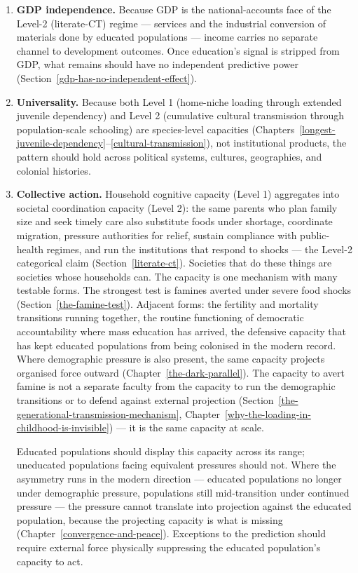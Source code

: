 \documentclass[12pt,letterpaper]{article}
\begin{document}
\begin{enumerate}
\item \textbf{GDP independence.} Because GDP is the
national-accounts face of the Level-2 (literate-CT) regime ---
services and the industrial conversion of materials done by educated
populations --- income carries no separate channel to development
outcomes. Once education's signal is stripped from GDP, what remains
should have no independent predictive power
(Section~\ref{gdp-has-no-independent-effect}).\label{pred:income}

\item \textbf{Universality.} Because both Level 1 (home-niche
loading through extended juvenile dependency) and Level 2
(cumulative cultural transmission through population-scale
schooling) are species-level capacities
(Chapters~\ref{longest-juvenile-dependency}--\ref{cultural-transmission}),
not institutional products, the pattern should hold across political
systems, cultures, geographies, and colonial
histories.\label{pred:universality}

\item \textbf{Collective action.} Household cognitive capacity
(Level 1) aggregates into societal coordination capacity (Level 2):
the same parents who plan family size and seek timely care also
substitute foods under shortage, coordinate migration, pressure
authorities for relief, sustain compliance with public-health
regimes, and run the institutions that respond to shocks --- the
Level-2 categorical claim (Section~\ref{literate-ct}). Societies
that do these things are societies whose households can. The capacity is one mechanism with many testable forms. The strongest
test is famines averted under severe food shocks
(Section~\ref{the-famine-test}). Adjacent forms: the fertility and
mortality transitions running together, the routine functioning of
democratic accountability where mass education has arrived, the
defensive capacity that has kept educated populations from being
colonised in the modern record. Where demographic pressure is also
present, the same capacity projects organised force outward
(Chapter~\ref{the-dark-parallel}). The capacity to avert
famine is not a separate faculty from the capacity to run the
demographic transitions or to defend against external projection
(Section~\ref{the-generational-transmission-mechanism},
Chapter~\ref{why-the-loading-in-childhood-is-invisible}) --- it is the same capacity
at scale.

Educated populations should display this capacity across its
range; uneducated populations facing equivalent pressures should not.
Where the asymmetry runs in the modern direction --- educated
populations no longer under demographic pressure, populations still
mid-transition under continued pressure --- the pressure cannot
translate into projection against the educated population, because the
projecting capacity is what is missing
(Chapter~\ref{convergence-and-peace}). Exceptions to the prediction
should require external force physically suppressing the educated
population's capacity to act.\label{pred:collective-action}
\end{enumerate}
\end{document}
